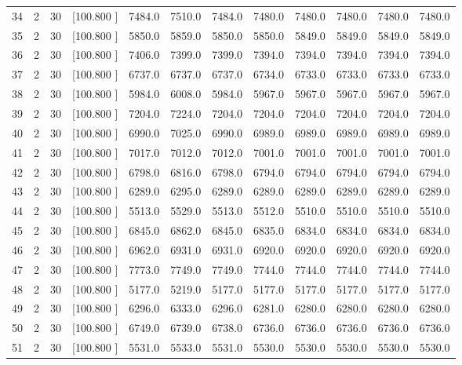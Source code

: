 \documentclass[12pt,a4paper]{article}
\begin{document}
\begin{center}
{\begin{tabular}{r r r r r r r r r r r r}
  34&  2& 30&[100.800   ]&  7484.0&  7510.0&  7484.0&  7480.0&  7480.0&  7480.0&  7480.0&  7480.0\\[-0.02in]
  35&  2& 30&[100.800   ]&  5850.0&  5859.0&  5850.0&  5850.0&  5849.0&  5849.0&  5849.0&  5849.0\\[-0.02in]
  36&  2& 30&[100.800   ]&  7406.0&  7399.0&  7399.0&  7394.0&  7394.0&  7394.0&  7394.0&  7394.0\\[-0.02in]
  37&  2& 30&[100.800   ]&  6737.0&  6737.0&  6737.0&  6734.0&  6733.0&  6733.0&  6733.0&  6733.0\\[-0.02in]
  38&  2& 30&[100.800   ]&  5984.0&  6008.0&  5984.0&  5967.0&  5967.0&  5967.0&  5967.0&  5967.0\\[-0.02in]
  39&  2& 30&[100.800   ]&  7204.0&  7224.0&  7204.0&  7204.0&  7204.0&  7204.0&  7204.0&  7204.0\\[-0.02in]
  40&  2& 30&[100.800   ]&  6990.0&  7025.0&  6990.0&  6989.0&  6989.0&  6989.0&  6989.0&  6989.0\\[-0.02in]
  41&  2& 30&[100.800   ]&  7017.0&  7012.0&  7012.0&  7001.0&  7001.0&  7001.0&  7001.0&  7001.0\\[-0.02in]
  42&  2& 30&[100.800   ]&  6798.0&  6816.0&  6798.0&  6794.0&  6794.0&  6794.0&  6794.0&  6794.0\\[-0.02in]
  43&  2& 30&[100.800   ]&  6289.0&  6295.0&  6289.0&  6289.0&  6289.0&  6289.0&  6289.0&  6289.0\\[-0.02in]
  44&  2& 30&[100.800   ]&  5513.0&  5529.0&  5513.0&  5512.0&  5510.0&  5510.0&  5510.0&  5510.0\\[-0.02in]
  45&  2& 30&[100.800   ]&  6845.0&  6862.0&  6845.0&  6835.0&  6834.0&  6834.0&  6834.0&  6834.0\\[-0.02in]
  46&  2& 30&[100.800   ]&  6962.0&  6931.0&  6931.0&  6920.0&  6920.0&  6920.0&  6920.0&  6920.0\\[-0.02in]
  47&  2& 30&[100.800   ]&  7773.0&  7749.0&  7749.0&  7744.0&  7744.0&  7744.0&  7744.0&  7744.0\\[-0.02in]
  48&  2& 30&[100.800   ]&  5177.0&  5219.0&  5177.0&  5177.0&  5177.0&  5177.0&  5177.0&  5177.0\\[-0.02in]
  49&  2& 30&[100.800   ]&  6296.0&  6333.0&  6296.0&  6281.0&  6280.0&  6280.0&  6280.0&  6280.0\\[-0.02in]
  50&  2& 30&[100.800   ]&  6749.0&  6739.0&  6738.0&  6736.0&  6736.0&  6736.0&  6736.0&  6736.0\\[-0.02in]
  51&  2& 30&[100.800   ]&  5531.0&  5533.0&  5531.0&  5530.0&  5530.0&  5530.0&  5530.0&  5530.0\\[-0.02in]

\end{tabular}}
\end{center}
\end{document}
